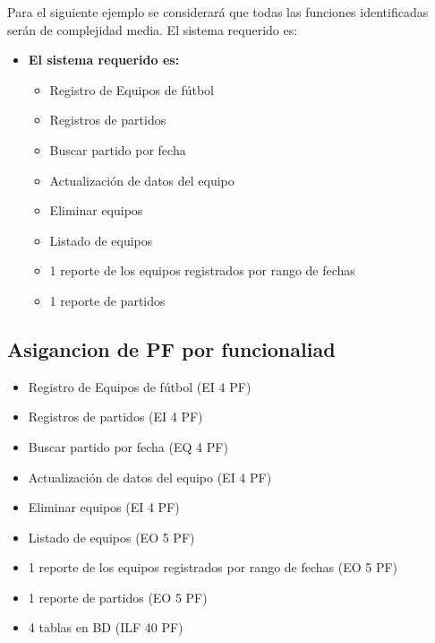 \documentclass{article}
\begin{document}
Para el siguiente ejemplo se considerará que todas las funciones identificadas serán de complejidad media. El sistema requerido es:

\begin{itemize}
    \item \textbf{El sistema requerido es:}

    \begin{itemize}
    
        \item Registro de Equipos de fútbol
        \item Registros de partidos
        \item Buscar partido por fecha
        \item Actualización de datos del equipo
        \item Eliminar equipos
        \item Listado de equipos
        \item 1 reporte de los equipos registrados por rango de fechas
        \item 1 reporte de partidos
    \end{itemize}
\end{itemize}

\subsection{Asigancion de PF por funcionaliad}


\begin{itemize}
    \item Registro de Equipos de fútbol (EI 4 PF)
    \item Registros de partidos (EI 4 PF)
    \item Buscar partido por fecha (EQ 4 PF)
    \item Actualización de datos del equipo (EI 4 PF)
    \item Eliminar equipos (EI 4 PF)
    \item Listado de equipos (EO 5 PF)
    \item 1 reporte de los equipos registrados por rango de fechas (EO 5 PF)
    \item 1 reporte de partidos (EO 5 PF)
    \item 4 tablas en BD (ILF 40 PF)
\end{itemize}
\end{document}
